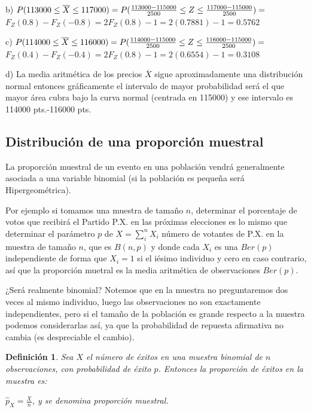 \documentclass[12pt]{report}
\newtheorem{definition}{Definici\'on}
\begin{document}
  b) $P(113000\leq  \overline{X} \leq 117000)=\\ P(\frac{113000-115000}{2500}\leq
  Z \leq \frac{117000-115000}{2500})=$
  $F_{Z}(0.8)-F_{Z}(-0.8)=
  2 F_{Z}(0.8) -1= 2 (0.7881)-1=0.5762$

  c) $P(114000\leq  \overline{X} \leq 116000)=\\ P(\frac{114000-115000}{2500}\leq
  Z \leq \frac{116000-115000}{2500})=$
  $F_{Z}(0.4)-F_{Z}(-0.4)=2 F_{Z}(0.8) -1= 2 (0.6554)-1=0.3108$

  d) La media aritmética de los precios $\overline{X}$ sigue
  aproximadamente una distribución normal entonces gráficamente el
  intervalo de mayor probabilidad será el que mayor área cubra bajo
  la curva normal (centrada en 115000) y ese intervalo es
  114000 pts.-116000 pts.


    \subsection{Distribución de una proporción muestral}
    La proporción muestral de un evento en una población vendrá
    generalmente asociada a una variable binomial (si la población es
    pequeña será Hipergeométrica).

    Por ejemplo si tomamos una muestra de tamaño $n$, determinar
    el porcentaje de votos que recibirá el Partido P.X. en las
    próximas elecciones es lo mismo que determinar el parámetro $p$ de
    $X=\sum_{i}^{n}X_i$ número de votantes de P.X. en la muestra de tamaño $n$,
    que es $B(n,p)$ y donde cada $X_i$ es una $Ber(p)$ independiente de forma que $X_i=1$
    si el iésimo individuo y cero en caso contrario, así que la proporción muetral es la media
    aritmética de observaciones $Ber(p)$.

    ¿Será realmente binomial? Notemos que en la
    muestra no preguntaremos dos veces al mismo individuo,
    luego las observaciones no son exactamente independientes,
    pero si el tamaño de la población es grande respecto a
    la muestra podemos considerarlas así, ya que la probabilidad de repuesta afirmativa no cambia
    (es despreciable el cambio).

    \begin{definition}
    Sea $X$ el número de éxitos en una muestra binomial de $n$
    observaciones, con probabilidad de éxito $p$. Entonces la
    proporción de éxitos en la muestra es:

    $\hat{p}_{X}=\frac{X}{n}$,  y se denomina proporción muestral.
\end{definition}
\end{document}

